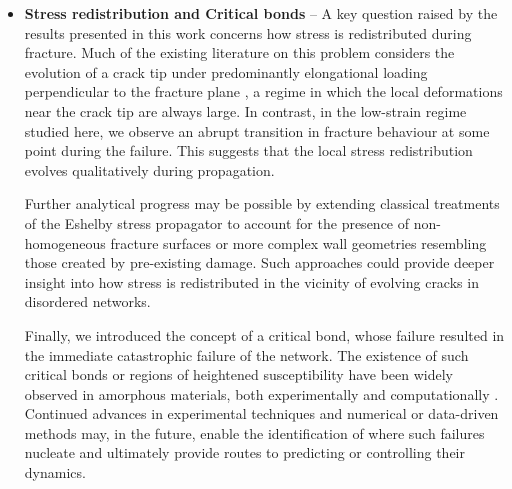 \begin{itemize}
    However, in the networks considered here, the relaxation time increases as the connectivity is reduced towards the isostatic point $z_c$, diverging as a power law at $z_c$ \cite{shivers_strain-controlled_2023}. This could, in principle, provide an alternative athermal route to ultra-delayed failure if the material relaxes sufficiently slowly. However, in this regime, the sample-to-sample variance of the fracture strain also grows significantly \cite{zhang_fiber_2017}, so failure becomes strongly dependent on the specific network realisation. Moreover, it is not clear that a marginally stable network is able to store sufficient elastic energy to fail a long time after the imposed strain.  As a result, although an athermal mechanism cannot be excluded, it would require fine tuning of connectivity and imposed strain (if it is possible), and is therefore unlikely to provide a robust route to ultra-delayed failure.
    
    \item {\bf Stress redistribution and Critical bonds} -- A key question raised by the results presented in this work concerns how stress is redistributed during fracture. Much of the existing literature on this problem considers the evolution of a crack tip under predominantly elongational loading perpendicular to the fracture plane \cite{sanner_less_2025, bolander_fracture_1998, shekhawat_damage_2013, slepyan_models_2002, ju_role_nodate}, a regime in which the local deformations near the crack tip are always large. In contrast, in the low-strain regime studied here, we observe an abrupt transition in fracture behaviour at some point during the failure. This suggests that the local stress redistribution evolves qualitatively during propagation. 

    Further analytical progress may be possible by extending classical treatments of the Eshelby stress propagator \cite{picard_elastic_2004, eshelby_determination_1997} to account for the presence of non-homogeneous fracture surfaces or more complex wall geometries resembling those created by pre-existing damage. Such approaches could provide deeper insight into how stress is redistributed in the vicinity of evolving cracks in disordered networks.

    Finally, we introduced the concept of a critical bond, whose failure resulted in the immediate catastrophic failure of the network. The existence of such critical bonds or regions of heightened susceptibility have been widely observed in amorphous materials, both experimentally and computationally \cite{mattsson_time-dependent_2017,cipelletti_microscopic_2020,yu_shortest_2024,membrillo_solis_tracking_2022,ozawaRareEventsDisorder2022,aimeMicroscopicDynamicsFailure2018,nabizadeh_network_2024}. Continued advances in experimental techniques \cite{porr_probing_2025} and numerical or data-driven methods \cite{mangal_predicting_2024,mangal_topological_2023,cubuk_identifying_2015} may, in the future, enable the identification of where such failures nucleate and ultimately provide routes to predicting or controlling their dynamics.
    

\end{itemize}
